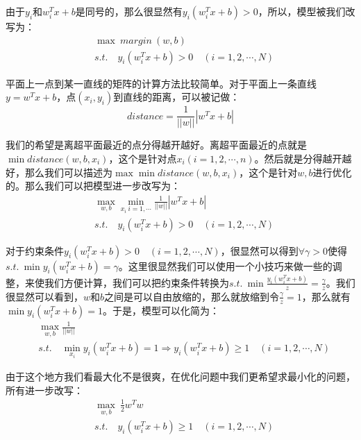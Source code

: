 \documentclass[a4paper]{article}
\begin{document}
由于$y_i$和$w^T_ix+b$是同号的，那么很显然有$y_i(w^T_ix+b)>0$，所以，模型被我们改写为：
\begin{equation}
    \begin{split}
        & \max \ margin\ (w,b) \\
        & s.t.\quad y_i(w^T_ix+b)>0 \quad (i = 1,2,\cdots,N)
    \end{split}
\end{equation}

平面上一点到某一直线的矩阵的计算方法比较简单。对于平面上一条直线$y=w^Tx+b$，点$(x_i,y_i)$到直线的距离，可以被记做：
\begin{equation}
    distance = \frac{1}{||w||}|w^Tx+b|
\end{equation}

我们的希望是离超平面最近的点分得越开越好。离超平面最近的点就是$\min distance(w,b,x_i)$，这个是针对点$x_i (i=1,2,\cdots,n)$。然后就是分得越开越好，那么我们可以描述为$\max \min distance(w,b,x_i)$，这个是针对$w,b$进行优化的。那么我们可以把模型进一步改写为：
\begin{equation}
    \begin{split}
        & \max_{w,b} \min_{x_i\ i = 1,\cdots} \frac{1}{||w||}|w^Tx+b| \\
        & s.t.\quad y_i(w^T_ix+b)>0 \quad (i = 1,2,\cdots,N)
    \end{split}
\end{equation}

对于约束条件$y_i(w^T_ix+b)>0 \quad (i = 1,2,\cdots,N)$，很显然可以得到$\forall \gamma > 0$使得$s.t.\ \min y_i(w^T_ix+b)=\gamma$。这里很显然我们可以使用一个小技巧来做一些的调整，来使我们方便计算，我们可以把约束条件转换为$s.t.\ \min \frac{y_i(w^T_ix+b)}{z}=\frac{\gamma}{z}$。我们很显然可以看到，$w$和$b$之间是可以自由放缩的，那么就放缩到令$\frac{\gamma}{z}=1$，那么就有$\min y_i(w^T_ix+b)=1$。于是，模型可以化简为：
\begin{equation}
    \begin{split}
        & \max_{w,b} \frac{1}{||w||} \\
        & s.t.\quad \min_{x_i} y_i(w^T_ix+b)=1 \Longrightarrow y_i(w^T_ix+b)\geq 1 \quad (i = 1,2,\cdots,N)
    \end{split}
\end{equation}

由于这个地方我们看最大化不是很爽，在优化问题中我们更希望求最小化的问题，所有进一步改写：
\begin{equation}
    \begin{split}
        & \max_{w,b} \ \frac{1}{2} w^Tw \\
        & s.t. \quad y_i(w^T_ix+b)\geq 1 \quad (i = 1,2,\cdots,N)
    \end{split}
\end{equation}
\end{document}
